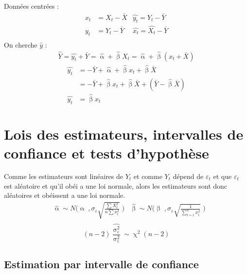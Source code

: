 \documentclass{article}
\newcommand{\hbeta}{\hat{\upbeta}}
\newcommand{\halpha}{\hat{\upalpha}}
\newcommand{\et}{\varepsilon_t}
\newcommand{\sumt}{\sum\limits_{t=1}^n}
\newcommand{\sig}{\upsigma_\varepsilon^2}
\begin{document}
Données centrées : 
\begin{align*}
	x_t &= X_t - \bar{X} &\hat{y_t} = \hat{Y_t} - \bar{Y}\\
	y_t &= Y_t - \bar{Y} &\hat{x_t} = \hat{X_t} - \bar{Y}\\
\end{align*}
On cherche \(\hat{y} \) :
\begin{align*}
	\hat{Y} = \hat{y_t} + \bar{Y} = \hat{\upalpha} + \hat{\upbeta} X_t  = \hat{\upalpha} + \hat{\upbeta} (x_t + \bar{X})	
\end{align*} 
\begin{align*}
	\hat{y_t} &= - \bar{Y} + \halpha + \hbeta x_t + \hbeta \bar{X} \\
	&= - \bar{Y} + \hbeta x_t + \hbeta \bar{X} + (\bar{Y} - \hbeta \bar{X}) \\
	\hat{y_t} &= \hbeta x_t
\end{align*}

\section{Lois des estimateurs, intervalles de confiance et tests d'hypothèse}
Comme les estimateurs sont linéaires de \(Y_t\) et comme \(Y_t\) dépend de \(\et\) et que \(\et\) est aléatoire et qu'il obéi a une loi normale, alors les estimateurs sont donc aléatoires et obéissent a une loi normale.
\begin{align*}
	& \halpha \sim N \Bigg(\upalpha \; , \sigma_\varepsilon \sqrt{\frac{\sum X^2_t}{n \sum x_t^2 }} \; \Bigg) &\hbeta \sim N \Bigg( \upbeta \; , \sigma_\varepsilon \sqrt{\frac{1}{\sumt x_t^2}} \; \Bigg) \\
\end{align*}
\[(n-2) \frac{\hat{\sig}}{\sig} \sim \upchi^2 (n-2)\]

\subsection{Estimation par intervalle de confiance}
\end{document}
